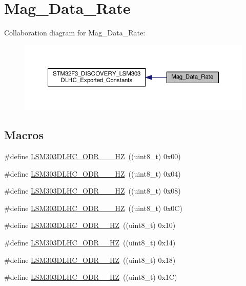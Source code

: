 \hypertarget{group__Mag__Data__Rate}{\section{Mag\+\_\+\+Data\+\_\+\+Rate}
\label{group__Mag__Data__Rate}
}
Collaboration diagram for Mag\+\_\+\+Data\+\_\+\+Rate\+:\nopagebreak
\begin{figure}[H]
\begin{center}
\leavevmode
\includegraphics[width=350pt]{group__Mag__Data__Rate}
\end{center}
\end{figure}
\subsection*{Macros}
\begin{DoxyCompactItemize}
\item 
\#define \hyperlink{group__Mag__Data__Rate_ga9e1976d14bac2cdb35de4e33e748a7fd}{L\+S\+M303\+D\+L\+H\+C\+\_\+\+O\+D\+R\+\_\+\_\+\_\+\+H\+Z}~((uint8\+\_\+t) 0x00)
\item 
\#define \hyperlink{group__Mag__Data__Rate_ga3c942b97148bcc2cbc963ef1548d5a4d}{L\+S\+M303\+D\+L\+H\+C\+\_\+\+O\+D\+R\+\_\+\_\+\_\+\+H\+Z}~((uint8\+\_\+t) 0x04)
\item 
\#define \hyperlink{group__Mag__Data__Rate_gad5af1cfa722c9b7bff007783f46e0b92}{L\+S\+M303\+D\+L\+H\+C\+\_\+\+O\+D\+R\+\_\+\_\+\_\+\+H\+Z}~((uint8\+\_\+t) 0x08)
\item 
\#define \hyperlink{group__Mag__Data__Rate_gafcc36dcf2fc82bda40fe76482177a28c}{L\+S\+M303\+D\+L\+H\+C\+\_\+\+O\+D\+R\+\_\+\_\+\_\+\+H\+Z}~((uint8\+\_\+t) 0x0\+C)
\item 
\#define \hyperlink{group__Mag__Data__Rate_gabd5845e4ee7f820d7195f55aee504c0e}{L\+S\+M303\+D\+L\+H\+C\+\_\+\+O\+D\+R\+\_\+\_\+\+H\+Z}~((uint8\+\_\+t) 0x10)
\item 
\#define \hyperlink{group__Mag__Data__Rate_gaeec8f8bf3df3f686d8894624cf8a5448}{L\+S\+M303\+D\+L\+H\+C\+\_\+\+O\+D\+R\+\_\+\_\+\+H\+Z}~((uint8\+\_\+t) 0x14)
\item 
\#define \hyperlink{group__Mag__Data__Rate_ga5baba0fd2fd46994f12635b4a331eda7}{L\+S\+M303\+D\+L\+H\+C\+\_\+\+O\+D\+R\+\_\+\_\+\+H\+Z}~((uint8\+\_\+t) 0x18)
\item 
\#define \hyperlink{group__Mag__Data__Rate_ga26082ffb8d5da442a9e5167de6c029d1}{L\+S\+M303\+D\+L\+H\+C\+\_\+\+O\+D\+R\+\_\+\_\+\+H\+Z}~((uint8\+\_\+t) 0x1\+C)
\end{DoxyCompactItemize}


